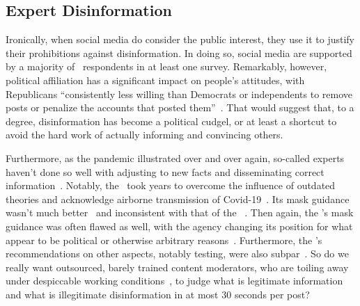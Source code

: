 \subsection{Expert Disinformation}

Ironically, when social media do consider the public interest, they use it to
justify their prohibitions against disinformation. In doing so, social media are
supported by a majority of \US\ respondents in at least one survey. Remarkably,
however, political affiliation has a significant impact on people's attitudes,
with Republicans ``consistently less willing than Democrats or independents to
remove posts or penalize the accounts that posted
them''~\cite{KozyrevaHerzogea2023}. That would suggest that, to a degree,
disinformation has become a political cudgel, or at least a shortcut to avoid
the hard work of actually informing and convincing others.

Furthermore, as the pandemic illustrated over and over again, so-called experts
haven't done so well with adjusting to new facts and disseminating correct
information~\cite{SinghMcNabea2021}. Notably, the \WHO\ took years to overcome
the influence of outdated theories and acknowledge airborne transmission of
Covid-19~\cite{Chamary2021,GreenhalghOzbilginea2022,JimenezMarrea2022,Lewis2022,SirleafClark2021,SirleafClarkea2021}.
Its mask guidance wasn't much better~\cite{ChanLeungea2020} and inconsistent
with that of the \CDC~\cite{Curtis2020}. Then again, the \CDC's mask guidance
was often flawed as well, with the agency changing its position for what appear
to be political or otherwise arbitrary reasons~\cite{Netburn2021}. Furthermore,
the \CDC's recommendations on other aspects, notably testing, were also
subpar~\cite{Flam2022,Ngo2022,Scott2022}. So do we really want outsourced,
barely trained content moderators, who are toiling away under despiccable
working conditions~\cite{Newton2019b,Newton2019}, to judge what is legitimate
information and what is illegitimate disinformation in at most 30 seconds per
post?

